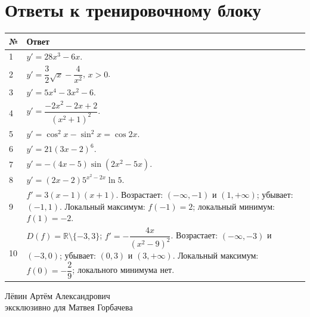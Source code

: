 \documentclass[a4paper,12pt]{article}
\begin{document}
\section*{Ответы к тренировочному блоку}
\renewcommand{\arraystretch}{1.6}
\begin{tabularx}{\linewidth}{@{}p{1cm}X@{}}
\toprule
№ & Ответ\\
\midrule
1 & $y'=28x^3-6x$.\\
2 & $y'=\dfrac32\sqrt{x}-\dfrac4{x^2}$, $x>0$.\\
3 & $y'=5x^4-3x^2-6$.\\
4 & $y'=\dfrac{-2x^2-2x+2}{(x^2+1)^2}$.\\
5 & $y'=\cos^2x-\sin^2x=\cos2x$.\\
6 & $y'=21(3x-2)^6$.\\
7 & $y'=-(4x-5)\sin(2x^2-5x)$.\\
8 & $y'=(2x-2)5^{x^2-2x}\ln5$.\\
9 & $f'=3(x-1)(x+1)$. Возрастает: $(-\infty,-1)$ и $(1,+\infty)$; убывает: $(-1,1)$. Локальный максимум: $f(-1)=2$; локальный минимум: $f(1)=-2$.\\
10 & $D(f)=\mathbb R\setminus\{-3,3\}$; $f'=-\dfrac{4x}{(x^2-9)^2}$. Возрастает: $(-\infty,-3)$ и $(-3,0)$; убывает: $(0,3)$ и $(3,+\infty)$. Локальный максимум: $f(0)=-\dfrac29$; локального минимума нет.\\
\bottomrule
\end{tabularx}
\vfill
\begin{center}
{\small\color{softgray} Лёвин Артём Александрович\\ эксклюзивно для Матвея Горбачева}
\end{center}
\end{document}
